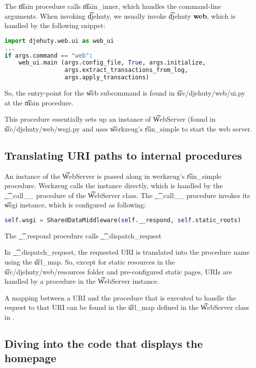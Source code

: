 The \t{main} procedure calls \t{main\_inner}, which handles the command-line
arguments.  When invoking \t{djehuty}, we usually invoke
\t{djehuty \textbf{web}}, which is handled by the following snippet:
\begin{lstlisting}[language=python]
import djehuty.web.ui as web_ui
...
if args.command == "web":
    web_ui.main (args.config_file, True, args.initialize,
                 args.extract_transactions_from_log,
                 args.apply_transactions)
\end{lstlisting}

So, the entry-point for the \t{web} subcommand is found in
\t{src/djehuty/web/ui.py} at the \t{main} procedure.

This procedure essentially sets up an instance of \t{WebServer} (found in
\t{src/djehuty/web/wsgi.py} and uses \t{werkzeug}'s \t{run\_simple} to start
the web server.

\subsection{Translating URI paths to internal procedures}

An instance of the \t{WebServer} is passed along in werkzeug's \t{run\_simple}
procedure.  Werkzeug calls the instance directly, which is handled by the
\t{\_\_call\_\_} procedure of the \t{WebServer} class.  The \t{\_\_call\_\_} procedure
invokes its \t{wsgi} instance, which is configured as following:
\begin{lstlisting}[language=python]
self.wsgi = SharedDataMiddleware(self.__respond, self.static_roots)
\end{lstlisting}

The \t{\_\_respond} procedure calls \t{\_\_dispatch\_request}

In \t{\_\_dispatch\_request}, the requested URI is translated into the procedure
name using the \t{url\_map}.  So, except for static resources in the
\t{src/djehuty/web/resources} folder and pre-configured static pages, URIs are
handled by a procedure in the \t{WebServer} instance.

A mapping between a URI and the procedure that is executed to handle the
request to that URI can be found in the \t{url\_map} defined in the
\t{WebServer} class in .

\subsection{Diving into the code that displays the homepage}

